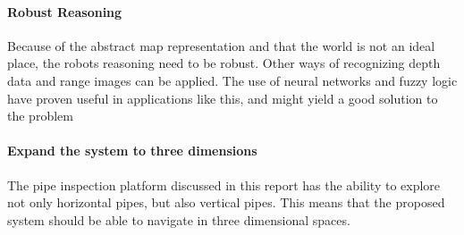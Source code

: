 \paragraph{Robust Reasoning} Because of the abstract map representation and that the world
is not an ideal place, the robots reasoning need to be robust. Other ways of recognizing
depth data and range images can be applied. The use of neural networks and fuzzy logic
have proven useful in applications like this, and might yield a good solution to the
problem

\paragraph{Expand the system to three dimensions} The pipe inspection platform discussed in this report
has the ability to explore not only horizontal pipes, but also vertical pipes. This means
that the proposed system should be able to navigate in three dimensional spaces. 

